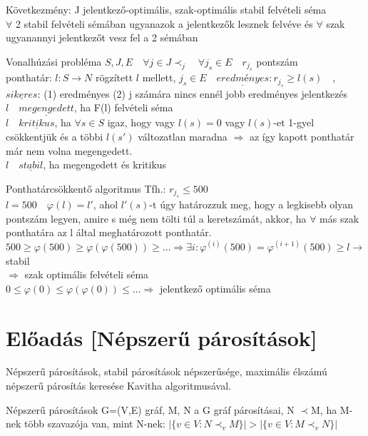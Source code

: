 	Következmény: J jelentkező-optimális, szak-optimális stabil felvételi séma \\
	$\forall$ 2 stabil felvételi sémában ugyanazok a jelentkezők lesznek felvéve és $\forall$ szak ugyanannyi jelentkezőt vesz fel a 2 sémában
	
	\begin{definition}{Vonalhúzási probléma}{}
		$S,J,E \quad \forall j \in J \prec_j \quad \forall j_s \in E \quad r_{j_s}$ pontszám \\
		ponthatár: $l: S \rightarrow N$ rögzített $l$ mellett, $j_s \in E \quad \underline{eredményes} : r_{j_s} \geq l(s) \quad $, $ \underline{sikeres}$: (1) eredményes (2) j számára nincs ennél jobb eredményes jelentkezés \\
		$l \quad \underline{megengedett}$, ha F(l) felvételi séma \\
		$l \quad \underline{kritikus}$, ha $\forall s \in S$ igaz, hogy vagy $l(s) = 0$ vagy $l(s)$-et 1-gyel csökkentjük és a többi $l(s')$ változatlan maradna $\Rightarrow$ az így kapott ponthatár már nem volna megengedett. \\
		$l \quad \underline{stabil}$, ha megengedett és kritikus
	\end{definition}
	
	\begin{definition}{Ponthatárcsökkentő algoritmus}{}
		Tfh.: $r_{j_s} \leq 500$ \\
		$l = 500 \quad \varphi(l) = l'$, ahol $l'(s)$-t úgy határozzuk meg, hogy a legkisebb olyan pontszám legyen, amire s még nem tölti túl a keretszámát, akkor, ha $\forall$ más szak ponthatára az l által meghatározott ponthatár. \\
		$500 \geq \varphi(500) \geq \varphi(\varphi(500)) \geq ... \Rightarrow \exists i : \varphi^{(i)}(500) = \varphi^{(i+1)}(500) \geq l \rightarrow$ stabil \\
		$\Rightarrow$ szak optimális felvételi séma \\
		$0 \leq \varphi(0) \leq \varphi(\varphi(0)) \leq ... \Rightarrow$ jelentkező optimális séma
	\end{definition}
	
	\newpage
	\section{Előadás [Népszerű párosítások]}
	Népszerű párosítások, stabil párosítások népszerűsége, maximális élszámú népszerű párosítás keresése Kavitha algoritmusával.
	
	\begin{definition}{Népszerű párosítások}{}
		G=(V,E) gráf, M, N a G gráf párosításai, N $\prec$M, ha M-nek több szavazója van, mint N-nek: $|\{v \in V: N \prec_v M \}|>|\{v\in V:M\prec_v N\}|$
	\end{definition}
	
